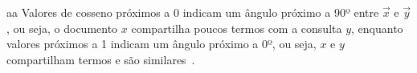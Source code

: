 aa
Valores de cosseno próximos a 0 indicam um ângulo próximo a 90º entre $\vec{x}$ e $\vec{y}$, ou seja, o documento $x$ compartilha poucos termos com a consulta $y$, enquanto valores próximos a 1 indicam um ângulo próximo a 0º, ou seja, $x$ e $y$ compartilham termos e são similares~\cite{Tan2005,Feldman2006}.













